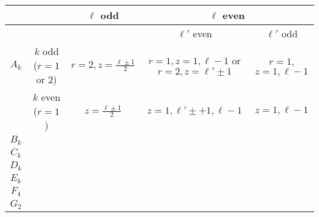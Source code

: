 \documentclass{amsart}
\begin{document}
\begin{tabular}{c|c||c|c|c}
      &                        & $\ell$ odd & \multicolumn{2}{|c}{$\ell$ even} \\
\hline
      &                        &            & $\ell'$ even & $\ell'$ odd        \\
\hline\hline
$A_k$ & $k$ odd ($r=1$ or $2$) & $r=2,z=\frac{\ell\pm1}{2}$ & $r=1,z=1,\ell-1$ or $r=2, z=\ell'\pm1$ & $r=1$, $z=1,\ell-1$ \\
      & $k$ even ($r=1$)       & $z=\frac{\ell\pm1}{2}$     & $z=1,\ell'\pm+1,\ell-1$                & $z=1,\ell-1$                   \\
\hline
$B_k$ &                        &            &              &                    \\
\hline
$C_k$ &                        &            &              &                    \\
\hline
$D_k$ &                        &            &              &                    \\
\hline
$E_k$ &                        &            &              &                    \\
\hline
$F_4$ &                        &            &              &                    \\
\hline
$G_2$ &                        &            &              &                    \\
\end{tabular}
\end{document}
